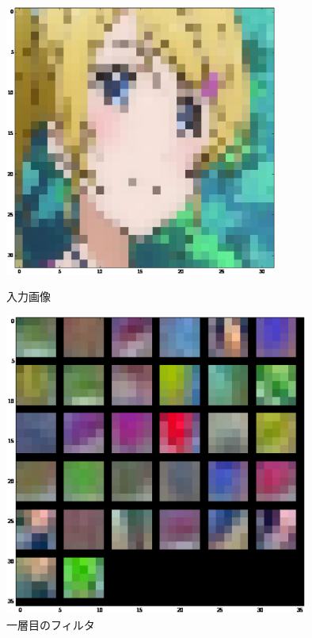 \documentclass[a4paper,10pt]{jsarticle}
\begin{document}
\begin{figure}[tb]
 \begin{center}
  \includegraphics[clip,width=9cm]{./fig/eps/inputeri.eps}
 \end{center}
 \caption{入力画像}
 \label{inputeri}
 \begin{center}
  \includegraphics[clip,width=10cm]{./fig/eps/filtereri.eps}
 \end{center}
 \caption{一層目のフィルタ}
 \label{filtereri}
\end{figure}
\end{document}
